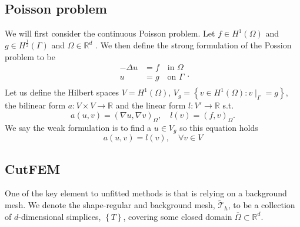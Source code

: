 \subsection{Poisson problem}%
\label{sub:possion_problem}
We will first consider the continuous Poisson problem. Let $f \in H^1( \Omega ) $ and $g \in H^{\frac{1}{2}}( \Gamma ) $ and $\Omega  \in \mathbb{R} ^{d}$ . We then define the strong formulation of the Possion problem to be \[
\begin{split}
    -\Delta u &= f \quad  \text{in }\Omega  \\
     u &= g  \quad \text{on } \Gamma    \\
\end{split} .
\]
Let us define the Hilbert spaces $V=H^{1}( \Omega ) $,   $V_{g} = \left\{ v \in H^{1}( \Omega ): v \mid _{\Gamma } = g \right\} $, the bilinear form $a: V \times V  \to \mathbb{R}  $ and the linear form $l: V'\to \mathbb{R}  $ s.t. \[
a( u,v) = ( \nabla u, \nabla v) _{\Omega }, \quad l( v) = (f,v)_{\Omega }.
\]
We say the weak formulation is to find a $u \in V_{g}$ so this equation holds  \[
a( u,v) = l( v), \quad  \forall v \in V
\]
\subsection{CutFEM }%
\label{sub:cutfem}


One of the key element to unfitted methods is that is relying on a background mesh. We denote the shape-regular and background mesh, $\widetilde{\mathcal{T}}_{h} $, to be a collection of $d$-dimensional simplices, $\left\{ T \right\} $, covering some closed domain
$\overline{\Omega } \subset \mathbb{R} ^{d} $.












